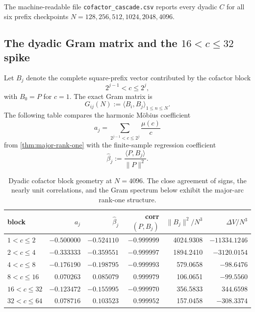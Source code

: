 \documentclass[11pt]{article}
\theoremstyle{definition}
\theoremstyle{remark}
\newcommand{\1}{\mathbf{1}}
\begin{document}
The machine-readable file \texttt{cofactor\_cascade.csv} reports every
dyadic $C$ for all six prefix checkpoints
$N=128,256,512,1024,2048,4096$.


\subsection{The dyadic Gram matrix and the $16<c\le32$ spike}
\label{subsec:dyadic-Gram}

Let $B_j$ denote the complete square-prefix vector contributed by the
cofactor block
\[
 2^{j-1}<c\le2^j,
\]
with $B_0=P$ for $c=1$.  The exact Gram matrix is
\begin{equation}
 G_{ij}(N):=\langle B_i,B_j\rangle_{1\le n\le N}.
 \label{eq:dyadic-Gram}
\end{equation}
The following table compares the harmonic M\"obius coefficient
\[
 a_j=\sum_{2^{j-1}<c\le2^j}\frac{\mu(c)}{c}
\]
from \cref{thm:major-rank-one} with the finite-sample regression
coefficient
\[
 \widehat\beta_j
 :=\frac{\langle P,B_j\rangle}{\|P\|^2}.
\]

\begin{table}[htbp]
\centering
\caption{Dyadic cofactor block geometry at $N=4096$.  The close
agreement of signs, the nearly unit correlations, and the Gram spectrum
below exhibit the major-arc rank-one structure.}
\label{tab:dyadic-Gram-blocks}
\scriptsize
\setlength{\tabcolsep}{4.0pt}
\begin{tabular}{lrrrrr}
\toprule
block & $a_j$ & $\widehat\beta_j$ & corr$(P,B_j)$ & $\|B_j\|^2/N^3$ & $\Delta V/N^3$\\
\midrule
$1<c\le2$   & $-0.500000$ & $-0.524110$ & $-0.999999$ & 4024.9308 & $-11334.1246$\\
$2<c\le4$   & $-0.333333$ & $-0.359551$ & $-0.999997$ & 1894.2410 & $-3120.0154$\\
$4<c\le8$   & $-0.176190$ & $-0.198795$ & $-0.999993$ & 579.0658 & $-98.6476$\\
$8<c\le16$  & $ 0.070263$ & $ 0.085079$ & $ 0.999979$ & 106.0651 & $-99.5560$\\
$16<c\le32$ & $-0.123472$ & $-0.155995$ & $-0.999970$ & 356.5833 & $ 344.6598$\\
$32<c\le64$ & $ 0.078716$ & $ 0.103523$ & $ 0.999952$ & 157.0458 & $-308.3374$\\
\bottomrule
\end{tabular}
\end{table}
\end{document}
